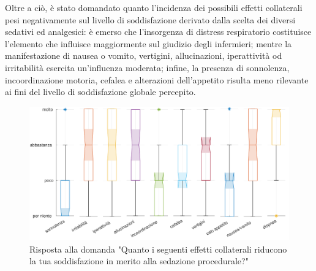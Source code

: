 Oltre a ciò, è stato domandato quanto l'incidenza dei possibili effetti collaterali pesi negativamente sul livello di soddisfazione derivato dalla scelta dei diversi sedativi ed analgesici: è emerso che l'insorgenza di distress respiratorio costituisce l'elemento che influisce maggiormente sul giudizio degli infermieri; mentre la manifestazione di nausea o vomito, vertigini, allucinazioni, iperattività od irritabilità esercita un'influenza moderata; infine, la presenza di sonnolenza, incoordinazione motoria, cefalea e alterazioni dell'appetito risulta meno rilevante ai fini del livello di soddisfazione globale percepito. 

\begin{figure}[h]
    \centering
    \includegraphics[width=1\textwidth]{Figure/influenza-effetti.pdf}
    \caption{Risposta alla domanda "Quanto i seguenti effetti collaterali riducono la tua soddisfazione in merito alla sedazione procedurale?"}
    \label{fig:influenzaeffetti}
\end{figure}

\newpage

